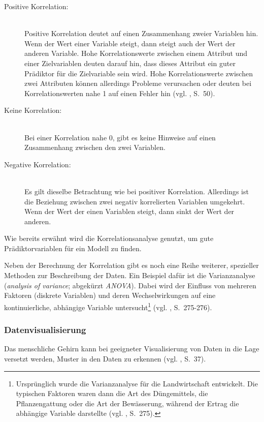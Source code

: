 \begin{description}

\item[Positive Korrelation:] \hfill \\
Positive Korrelation deutet auf einen Zusammenhang zweier Variablen hin. Wenn der Wert einer Variable steigt,
dann steigt auch der Wert der anderen Variable. Hohe Korrelationswerte zwischen einem Attribut und einer
Zielvariablen deuten darauf hin, dass dieses Attribut ein guter Prädiktor für die Zielvariable sein wird.
Hohe Korrelationswerte zwischen zwei Attributen können allerdings Probleme verursachen oder deuten bei Korrelationswerten nahe 1 auf einen
Fehler hin (vgl. \cite{Bowles}, S.~50).

\item[Keine Korrelation:] \hfill \\
Bei einer Korrelation nahe 0, gibt es keine Hinweise auf einen Zusammenhang zwischen den zwei Variablen.

\item[Negative Korrelation:] \hfill \\
Es gilt dieselbe Betrachtung wie bei positiver Korrelation. Allerdings ist die Beziehung zwischen zwei negativ korrelierten Variablen
umgekehrt. Wenn der Wert der einen Variablen steigt, dann sinkt der Wert der anderen.

\end{description}
Wie bereits erwähnt wird die Korrelationsanalyse genutzt, um gute Prädiktorvariablen für ein Modell zu finden.

Neben der Berechnung der Korrelation gibt es noch eine Reihe weiterer, spezieller
Methoden zur Beschreibung der Daten. Ein Beispiel dafür ist die Varianzanalyse
(\emph{analysis of variance}; abgekürzt \emph{ANOVA}). Dabei wird der Einfluss
von mehreren Faktoren (diskrete Variablen) und deren Wechselwirkungen auf eine
kontinuierliche, abhängige Variable untersucht\footnote{
Ursprünglich wurde die Varianzanalyse für die Landwirtschaft entwickelt. Die
typischen Faktoren waren dann die Art des Düngemittels, die Pflanzengattung oder
die Art der Bewässerung, während der Ertrag die abhängige Variable darstellte
(vgl. \cite{Bijma}, S.~275).
} (vgl. \cite{Bijma}, S.~275-276).


\subsubsection{Datenvisualisierung}

Das menschliche Gehirn kann bei geeigneter Visualisierung von Daten in die Lage
versetzt werden, Muster in den Daten zu erkennen (vgl. \cite{Runkler}, S.~37).

